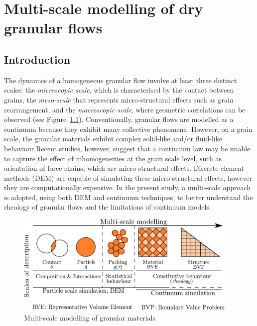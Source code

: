 \chapter{Multi-scale modelling of dry granular flows}

\ifpdf
    \graphicspath{{Chapter4/figs/raster/}{Chapter4/figs/pdf/}{Chapter4/figs/}}
\else
    \graphicspath{{Chapter4/figs/vector/}{Chapter4/figs/}}
\fi

\section{Introduction}

The dynamics of a homogeneous granular flow involve at least three distinct 
scales: the \textit{microscopic scale}, which 
is characterised by the contact between grains, the \textit{meso-scale} that 
represents micro-structural effects such as grain rearrangement, and the 
\textit{macroscopic scale}, where geometric correlations can be observed (see 
Figure~\ref{fig:multiscale}). Conventionally, granular flows are modelled as a 
continuum because they exhibit many collective phenomena. However, on a grain 
scale, the granular materials exhibit complex solid-like and/or fluid-like 
behaviour.Recent studies, however, suggest that a continuum law may be unable 
to capture the effect of inhomogeneities at the grain scale level, such as 
orientation of force chains, which are micro-structural effects. Discrete 
element methods (DEM) are capable of simulating these micro-structural effects, 
however they are computationally expensive. In the present study, a multi-scale 
approach is adopted, using both DEM and continuum techniques, to better 
understand the rheology of granular flows and the limitations of continuum 
models.

\begin{figure}[htbp]
\centering
\includegraphics[width=0.95\textwidth]{multiscale}
\caption{Multi-scale modelling of granular materials}
\label{fig:multiscale}
\end{figure}

